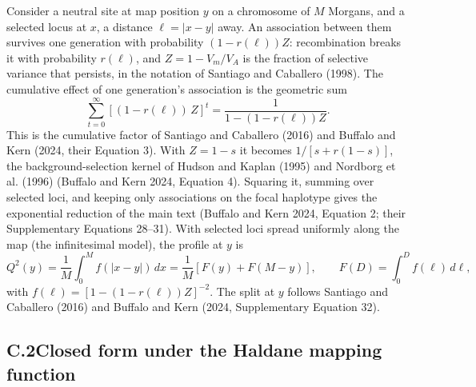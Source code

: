 \documentclass[12pt]{article}
\begin{document}
Consider a neutral site at map position $y$ on a chromosome of $M$ Morgans, and a selected locus at $x$, a distance $\ell = \vert x-y\vert$ away. An association between them survives one generation with probability $(1-r(\ell))Z$: recombination breaks it with probability $r(\ell)$, and $Z = 1 - V_m/V_A$ is the fraction of selective variance that persists, in the notation of Santiago and Caballero (1998). The cumulative effect of one generation's association is the geometric sum
\begin{equation}
    \sum_{t=0}^{\infty}\left[(1 - r(\ell))\,Z\right]^t = \frac{1}{1-(1-r(\ell))Z}.
\label{eq:geom_sum}
\end{equation}
This is the cumulative factor of Santiago and Caballero (2016) and Buffalo and Kern (2024, their Equation 3). With $Z = 1 - s$ it becomes $1/[s + r(1-s)]$, the background-selection kernel of Hudson and Kaplan (1995) and Nordborg et al. (1996) (Buffalo and Kern 2024, Equation 4). Squaring it, summing over selected loci, and keeping only associations on the focal haplotype gives the exponential reduction of the main text (Buffalo and Kern 2024, Equation 2; their Supplementary Equations 28--31). With selected loci spread uniformly along the map (the infinitesimal model), the profile at $y$ is
\begin{equation}
    Q^2(y) = \frac{1}{M}\int_0^M f(\vert x-y\vert)\,dx = \frac{1}{M}\left[F(y) + F(M-y)\right], \qquad F(D) = \int_0^D f(\ell)\,d\ell,
\label{eq:C_profile}
\end{equation}
with $f(\ell) = [1-(1-r(\ell))Z]^{-2}$. The split at $y$ follows Santiago and Caballero (2016) and Buffalo and Kern (2024, Supplementary Equation 32).

\subsection*{C.2\quad Closed form under the Haldane mapping function}
\end{document}
